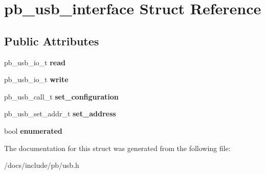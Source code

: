 \hypertarget{structpb__usb__interface}{}\section{pb\+\_\+usb\+\_\+interface Struct Reference}
\label{structpb__usb__interface}
\subsection*{Public Attributes}
\begin{DoxyCompactItemize}
\item 
\mbox{\label{structpb__usb__interface_a89048c2b97ec0760b94a34dd515820f0}} 
pb\+\_\+usb\+\_\+io\+\_\+t {\bfseries read}
\item 
\mbox{\label{structpb__usb__interface_a9765ec96f8214b1b0b4e12eef28c8f7b}} 
pb\+\_\+usb\+\_\+io\+\_\+t {\bfseries write}
\item 
\mbox{\label{structpb__usb__interface_afb980960e64261457b6c0ddede1da46d}} 
pb\+\_\+usb\+\_\+call\+\_\+t {\bfseries set\+\_\+configuration}
\item 
\mbox{\label{structpb__usb__interface_aa3f37d9a2738a2e25059dd74a01c1901}} 
pb\+\_\+usb\+\_\+set\+\_\+addr\+\_\+t {\bfseries set\+\_\+address}
\item 
\mbox{\label{structpb__usb__interface_acc52117398fe9d3c9445f392ed76aae8}} 
bool {\bfseries enumerated}
\end{DoxyCompactItemize}


The documentation for this struct was generated from the following file\+:\begin{DoxyCompactItemize}
\item 
/docs/include/pb/usb.\+h\end{DoxyCompactItemize}
